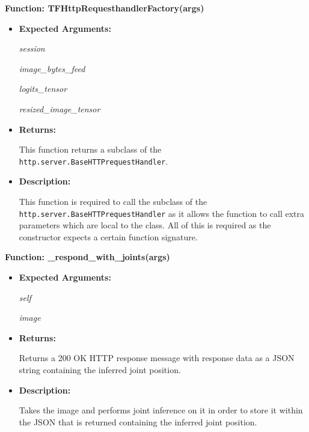 \documentclass{scrreprt}
\begin{document}
\textbf{Function: TFHttpRequesthandlerFactory(args)}
\begin{itemize}
    \item \textbf{Expected Arguments:}

            \quad\textit{session}

            \quad\textit{image\_bytes\_feed}

            \quad\textit{logits\_tensor}

            \quad\textit{resized\_image\_tensor}

    \item \textbf{Returns:}

            This function returns a subclass of the \verb|http.server.BaseHTTPrequestHandler|.

    \item \textbf{Description:}

            This function is required to call the subclass of the
                \verb|http.server.BaseHTTPrequestHandler| as it allows the function
                to call extra parameters which are local to the class. All of
                this is required as the constructor expects a certain function
                signature.

\end{itemize}

\textbf{Function: \_respond\_with\_joints(args)}
\begin{itemize}
    \item \textbf{Expected Arguments:}

            \quad\textit{self}

            \quad\textit{image}

    \item \textbf{Returns:}

            Returns a 200 OK HTTP response message with response data as a JSON
                string containing the inferred joint position.

    \item \textbf{Description:}

            Takes the image and performs joint inference on it in order to
                store it within the JSON that is returned containing the
                inferred joint position.

\end{itemize}
\end{document}
